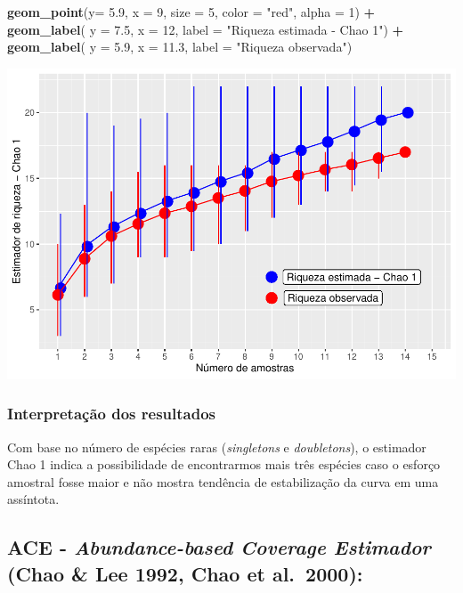 \documentclass[
]{book}
\newenvironment{Shaded}{\begin{snugshade}}{\end{snugshade}}
\newcommand{\DataTypeTok}[1]{\textcolor[rgb]{0.13,0.29,0.53}{#1}}
\newcommand{\DecValTok}[1]{\textcolor[rgb]{0.00,0.00,0.81}{#1}}
\newcommand{\FloatTok}[1]{\textcolor[rgb]{0.00,0.00,0.81}{#1}}
\newcommand{\KeywordTok}[1]{\textcolor[rgb]{0.13,0.29,0.53}{\textbf{#1}}}
\newcommand{\NormalTok}[1]{#1}
\newcommand{\OperatorTok}[1]{\textcolor[rgb]{0.81,0.36,0.00}{\textbf{#1}}}
\newcommand{\StringTok}[1]{\textcolor[rgb]{0.31,0.60,0.02}{#1}}
\begin{document}
\begin{Shaded}
\begin{Highlighting}[]
\StringTok{  }\KeywordTok{geom_point}\NormalTok{(}\DataTypeTok{y=} \FloatTok{5.9}\NormalTok{, }\DataTypeTok{x =} \DecValTok{9}\NormalTok{, }\DataTypeTok{size =} \DecValTok{5}\NormalTok{, }\DataTypeTok{color =} \StringTok{"red"}\NormalTok{, }\DataTypeTok{alpha =} \DecValTok{1}\NormalTok{) }\OperatorTok{+}\StringTok{ }
\StringTok{  }\KeywordTok{geom_label}\NormalTok{( }\DataTypeTok{y =} \FloatTok{7.5}\NormalTok{, }\DataTypeTok{x =} \DecValTok{12}\NormalTok{, }\DataTypeTok{label =} \StringTok{"Riqueza estimada - Chao 1"}\NormalTok{) }\OperatorTok{+}
\StringTok{  }\KeywordTok{geom_label}\NormalTok{( }\DataTypeTok{y =} \FloatTok{5.9}\NormalTok{, }\DataTypeTok{x =} \FloatTok{11.3}\NormalTok{, }\DataTypeTok{label =} \StringTok{"Riqueza observada"}\NormalTok{)}
\end{Highlighting}
\end{Shaded}

\includegraphics{livro_r_ecologia_files/figure-latex/unnamed-chunk-5-1.pdf}

\hypertarget{interpretauxe7uxe3o-dos-resultados-2}{%
\subsubsection{Interpretação dos resultados}\label{interpretauxe7uxe3o-dos-resultados-2}}

Com base no número de espécies raras (\emph{singletons} e \emph{doubletons}), o estimador Chao 1 indica a possibilidade de encontrarmos mais três espécies caso o esforço amostral fosse maior e não mostra tendência de estabilização da curva em uma assíntota.

\hypertarget{ace---abundance-based-coverage-estimador-chao-lee-1992-chao-et-al.-2000}{%
\subsection{\texorpdfstring{ACE - \emph{Abundance-based Coverage Estimador} (Chao \& Lee 1992, Chao et al.~2000):}{ACE - Abundance-based Coverage Estimador (Chao \& Lee 1992, Chao et al.~2000):}}\label{ace---abundance-based-coverage-estimador-chao-lee-1992-chao-et-al.-2000}}
\end{document}
